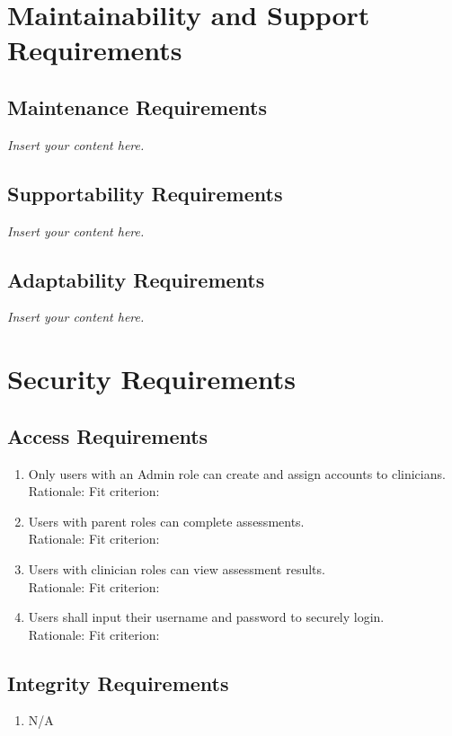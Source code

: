\documentclass[12pt]{article}
\newcommand{\lips}{\textit{Insert your content here.}}
\begin{document}
\section{Maintainability and Support Requirements}
\subsection{Maintenance Requirements}
\lips
\subsection{Supportability Requirements}
\lips
\subsection{Adaptability Requirements}
\lips

\section{Security Requirements}
\subsection{Access Requirements}
\begin{enumerate}[{SR-AC}1. ]
  \item Only users with an Admin role can create and assign accounts to clinicians.\\
  Rationale: 
  Fit criterion: 
  \item Users with parent roles can complete assessments.\\
  Rationale: 
  Fit criterion: 
  \item Users with clinician roles can view assessment results.\\
  Rationale: 
  Fit criterion: 
  \item Users shall input their username and password to securely login.\\
  Rationale: 
  Fit criterion: 
\end{enumerate}
\subsection{Integrity Requirements}
\begin{enumerate}[{SR-INT}1. ]
  \item N/A
\end{enumerate}
\end{document}
